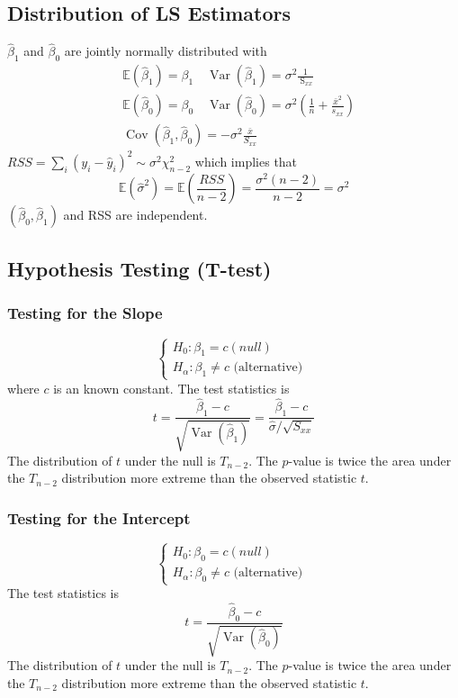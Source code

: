 \documentclass[11pt,a4paper]{article}
\begin{document}
\subsection{Distribution of LS Estimators}
$\hat{\beta}_{1}$ and $\hat{\beta}_{0}$ are jointly normally distributed with
$$
\begin{aligned}
&\mathbb{E}\left(\hat{\beta}_{1}\right)=\beta_{1} \quad \operatorname{Var}\left(\hat{\beta}_{1}\right)=\sigma^{2} \frac{1}{\mathrm{~S}_{x x}} \\
&\mathbb{E}\left(\hat{\beta}_{0}\right)=\beta_{0} \quad \operatorname{Var}\left(\hat{\beta}_{0}\right)=\sigma^{2}\left(\frac{1}{n}+\frac{\bar{x}^{2}}{s_{x x}}\right) \\
&\operatorname{Cov}\left(\hat{\beta}_{1}, \hat{\beta}_{0}\right)=-\sigma^{2} \frac{\bar{x}}{S_{x x}}
\end{aligned}
$$
$R S S=\sum_{i}\left(y_{i}-\hat{y}_{i}\right)^{2} \sim \sigma^{2} \chi_{n-2}^{2}$ which implies that
$$
\mathbb{E}\left(\hat{\sigma}^{2}\right)=\mathbb{E}\left(\frac{R S S}{n-2}\right)=\frac{\sigma^{2}(n-2)}{n-2}=\sigma^{2}
$$
$\left(\hat{\beta}_{0}, \hat{\beta}_{1}\right)$ and RSS are independent.

\subsection{Hypothesis Testing (T-test)}
\subsubsection{Testing for the Slope}
$$
\left\{\begin{array}{l}
H_{0}: \beta_{1}=c(n u l l) \\
H_{\alpha}: \beta_{1} \neq c \text { (alternative) }
\end{array}\right.
$$
where $c$ is an known constant.
The test statistics is
$$
t=\frac{\hat{\beta}_{1}-c}{\sqrt{\operatorname{Var}\left(\hat{\beta}_{1}\right)}}=\frac{\hat{\beta}_{1}-c}{\hat{\sigma} / \sqrt{S_{x x}}}
$$
The distribution of $t$ under the null is $T_{n-2}$.
The $p$-value is twice the area under the $T_{n-2}$ distribution more extreme than the observed statistic $t$.
\subsubsection{Testing for the Intercept}
$$
\left\{\begin{array}{l}
H_{0}: \beta_{0}=c(n u l l) \\
H_{\alpha}: \beta_{0} \neq c \text { (alternative) }
\end{array}\right.
$$
The test statistics is
$$
t=\frac{\hat{\beta}_{0}-c}{\sqrt{\operatorname{Var}\left(\hat{\beta}_{0}\right)}}
$$
The distribution of $t$ under the null is $T_{n-2}$.
The $p$-value is twice the area under the $T_{n-2}$ distribution more extreme than the observed statistic $t$.
\end{document}
